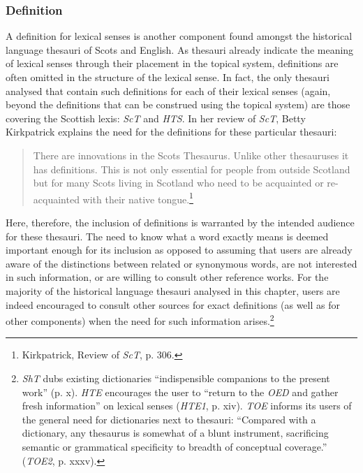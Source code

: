 \subsubsection{Definition}
A definition for lexical senses is another component found amongst the historical language thesauri of Scots and English.
As thesauri already indicate the meaning of lexical senses through their placement in the topical system, definitions are often omitted in the structure of the lexical sense. In fact, the only thesauri analysed that contain such definitions for each of their lexical senses (again, beyond the definitions that can be construed using the topical system) are those covering the Scottish lexis: \textit{ScT} and \textit{HTS}. In her review of \textit{ScT}, Betty Kirkpatrick explains the need for the definitions for these particular thesauri:
\begin{quotation} \noindent
There are innovations in the Scots Thesaurus. Unlike other thesauruses it has definitions. This is not only essential for people from outside Scotland but for many Scots living in Scotland who need to be acquainted or re-acquainted with their native tongue.\footnote{%
Kirkpatrick, Review of \textit{ScT}, %
p. 306.}
\end{quotation}
Here, therefore, the inclusion of definitions is warranted by the intended audience for these thesauri. The need to know what a word exactly means is deemed important enough for its inclusion as opposed to assuming that users are already aware of the distinctions between related or synonymous words, are not interested in such information, or are willing to consult other reference works. For the majority of the historical language thesauri analysed in this chapter, users are indeed encouraged to consult other sources for exact definitions (as well as for other components) when the need for such information arises.\footnote{\textit{ShT} dubs existing dictionaries ``indispensible companions to the present work'' (p. x). \textit{HTE} encourages the user to ``return to the \textit{OED} and gather fresh information'' on lexical senses (\textit{HTE1}, p. xiv). \textit{TOE} informs its users of the general need for dictionaries next to thesauri: ``Compared with a dictionary, any thesaurus is somewhat of a blunt instrument, sacrificing semantic or grammatical specificity to breadth of conceptual coverage.'' (\textit{TOE2}, p. xxxv). 
}

